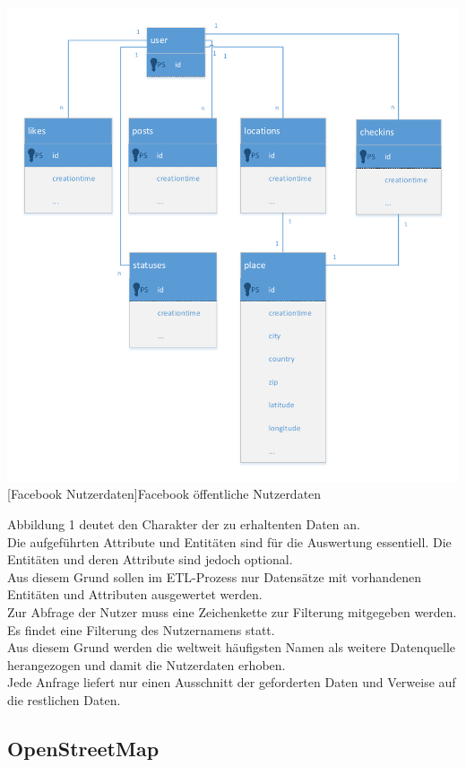 \documentclass[a4paper,12pt]{scrartcl}
\makeatletter
\def\ScaleIfNeeded{%
\ifdim\Gin@nat@width>\linewidth
\linewidth
\else
\Gin@nat@width
\fi
}
\makeatother
\begin{document}
\begin{center}
\centering
\includegraphics[width=\ScaleIfNeeded]{../user.pdf}%
[Facebook Nutzerdaten]{Facebook öffentliche Nutzerdaten}%
\end{center}

Abbildung 1 deutet den Charakter der zu erhaltenten Daten an.\\
Die aufgeführten Attribute und Entitäten sind für die Auswertung essentiell. Die Entitäten und deren Attribute sind jedoch optional.\\
Aus diesem Grund sollen im ETL-Prozess nur Datensätze mit vorhandenen Entitäten und Attributen ausgewertet werden.\\

Zur Abfrage der Nutzer muss eine Zeichenkette zur Filterung mitgegeben werden. Es findet eine Filterung des Nutzernamens statt.\\
Aus diesem Grund werden die weltweit häufigsten Namen als weitere Datenquelle herangezogen und damit die Nutzerdaten erhoben.\\

Jede Anfrage liefert nur einen Ausschnitt der geforderten Daten und Verweise auf die restlichen Daten.


\subsection{OpenStreetMap}
\end{document}
